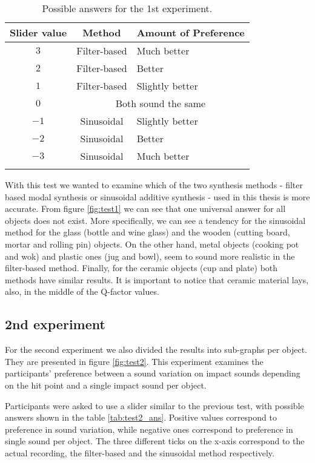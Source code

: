 \begin{table}[H]
	\centering
    \begin{tabular}{ c  c  l  }
    \toprule
    \textbf{Slider value} & \textbf{Method} & \textbf{Amount of Preference} \\ \toprule
    \addlinespace
    $3$ & Filter-based & Much better  \\
    $2$ & Filter-based & Better \\
    $1$ & Filter-based & Slightly better \\ 
    \addlinespace
    $0$ & \multicolumn{2}{c}{Both sound the same} \\
    \addlinespace
    $-1$ & Sinusoidal & Slightly better \\ 
    $-2$ & Sinusoidal & Better \\ 
    $-3$ & Sinusoidal & Much better \\
    \addlinespace
    \bottomrule
    \end{tabular}
    \caption{Possible answers for the 1st experiment.}
    \label{tab:test1_ans}
\end{table}  

With this test we wanted to examine which of the two synthesis methods - filter based modal synthesis or sinusoidal additive synthesis - used in this thesis is more accurate. From figure \ref{fig:test1} we can see that one universal answer for all objects does not exist. More specifically, we can see a tendency for the sinusoidal method for the glass (bottle and wine glass) and the wooden (cutting board, mortar and rolling pin) objects. On the other hand, metal objects (cooking pot and wok) and plastic ones (jug and bowl), seem to sound more realistic in the filter-based method. Finally, for the ceramic objects (cup and plate) both methods have similar results. It is important to notice that ceramic material lays, also, in the middle of the Q-factor values.

\subsection{2nd experiment}
For the second experiment we also divided the results into sub-graphs per object. They are presented in figure \ref{fig:test2}. This experiment examines the participants' preference between a sound variation on impact sounds depending on the hit point and a single impact sound per object.

Participants were asked to use a slider similar to the previous test, with possible answers shown in the table \ref{tab:test2_ans}. Positive values correspond to preference in sound variation, while negative ones correspond to preference in single sound per object. The three different ticks on the x-axis correspond to the actual recording, the filter-based and the sinusoidal method respectively. %

